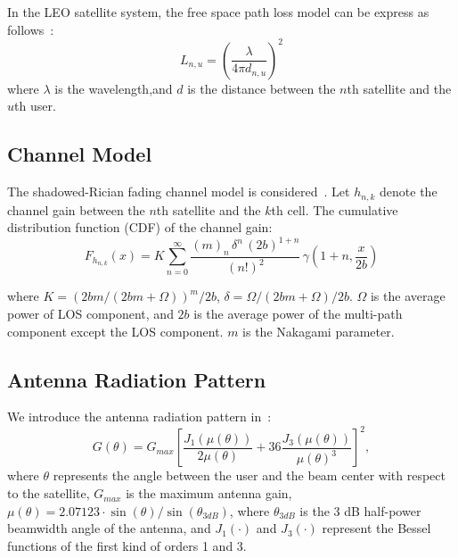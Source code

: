 In the LEO satellite system, the free space path loss model can be express as follows~\cite{Satellite-Multi-Beam}:
\begin{equation}
    L_{n,u} = \left(\frac{\lambda}{4\pi d_{n,u}}\right)^2
\end{equation}
where $\lambda$ is the wavelength,and $d$ is the distance between the $n$th satellite and the $u$th user.

\subsection{Channel Model}

The shadowed-Rician fading channel model is considered~\cite{channel-model}. Let $h_{n,k}$ denote the channel gain between the $n$th satellite and the $k$th cell. The cumulative distribution function (CDF) of the channel gain:
\begin{equation}
F_{h_{n,k}}(x) = K \sum_{n=0}^{\infty} \frac{(m)_n \, \delta^n \, (2b)^{1+n}}{(n!)^2} \, \gamma\left(1+n, \frac{x}{2b}\right)
\end{equation}

where $K = (2bm/(2bm+\Omega))^m/2b$, $\delta = \Omega/(2bm+\Omega)/2b$. $\Omega$ is the average power of LOS component, and $2b$ is the average power of the multi-path component except the LOS component. $m$ is the Nakagami parameter.

\subsection{Antenna Radiation Pattern}
We introduce the antenna radiation pattern in~\cite{Energy-Efficient}:
\begin{equation}
G(\theta) = G_{max} \left[ \frac{J_1\left(\mu(\theta)\right)}{2\mu(\theta)} 
+ 36 \frac{J_3\left(\mu(\theta)\right)}{\mu(\theta)^3} \right]^2,
\end{equation}
where $\theta$ represents the angle between the user and the beam center with respect to the satellite, $G_{max}$ is the maximum antenna gain, $\mu(\theta) = 2.07123\cdot \sin(\theta)/\sin(\theta_{3dB})$, 
where $\theta_{3dB}$ is the 3 dB half-power beamwidth angle of the antenna, and $J_1(\cdot)$ and $J_3(\cdot)$ represent the Bessel functions of the first kind of orders 1 and 3.

